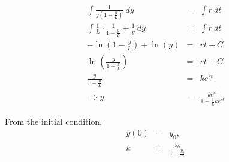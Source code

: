 \documentclass{beamer}
\newcommand{\lp}{\left(}
\newcommand{\rp}{\right)}
\begin{document}
  \begin{frame}

  \begin{eqnarray*}
      \int \frac{1}{y \lp 1 - \frac{y}{L} \rp} ~ dy & = & \int r ~ dt \\
      \int \frac{1}{L} \cdot \frac{1}{1 - \frac{y}{L}} + \frac{1}{y} ~ dy & = & \int r ~ dt \\
      -\ln\lp 1 - \frac{y}{L}\rp + \ln(y) & = & rt + C \\
      \ln\lp\frac{y}{1 - \frac{y}{L}}\rp & = & rt + C \\
      \frac{y}{1 - \frac{y}{L}} & = & k e^{rt} \\
      \Rightarrow y & = & \frac{k e^{rt}}{1 + \frac{1}{L} k e^{rt}}  
  \end{eqnarray*}


  From the initial condition,
  \begin{eqnarray*}
    y(0) & = & y_0, \\
    k & = & \frac{y_0}{1 - \frac{y_0}{L}}
  \end{eqnarray*}
  

\end{frame}
\end{document}
